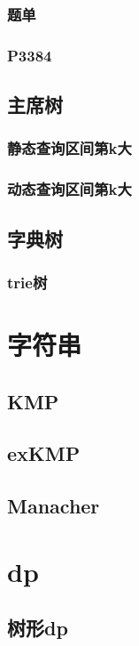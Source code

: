 \documentclass[10pt,a4paper]{article}
\begin{document}
\subsubsection{题单}

\subsubsection{P3384}

\subsection{主席树}
\subsubsection{静态查询区间第k大}

\subsubsection{动态查询区间第k大}

\subsection{字典树}
\subsubsection{trie树}

\section{字符串}
\subsection{KMP}

\subsection{exKMP}

\subsection{Manacher}

\section{dp}
\subsection{树形dp}
\end{document}
